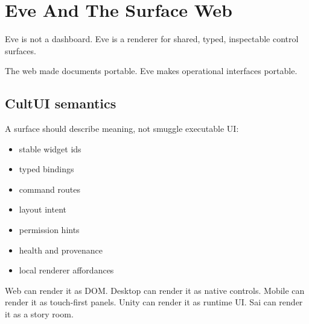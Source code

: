 \chapter{Eve And The Surface Web}

Eve is not a dashboard. Eve is a renderer for shared, typed, inspectable control surfaces.

\begin{center}
\end{center}

The web made documents portable. Eve makes operational interfaces portable.



\section{CultUI semantics}

A surface should describe meaning, not smuggle executable UI:

\begin{itemize}
  \item stable widget ids
  \item typed bindings
  \item command routes
  \item layout intent
  \item permission hints
  \item health and provenance
  \item local renderer affordances
\end{itemize}

Web can render it as DOM. Desktop can render it as native controls. Mobile can render it as touch-first panels. Unity can render it as runtime UI. Sai can render it as a story room.


